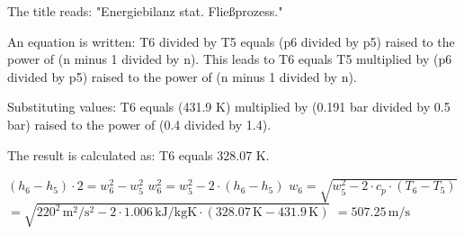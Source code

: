 The title reads: "Energiebilanz stat. Fließprozess."  

An equation is written:  
T6 divided by T5 equals (p6 divided by p5) raised to the power of (n minus 1 divided by n).  
This leads to T6 equals T5 multiplied by (p6 divided by p5) raised to the power of (n minus 1 divided by n).  

Substituting values:  
T6 equals (431.9 K) multiplied by (0.191 bar divided by 0.5 bar) raised to the power of (0.4 divided by 1.4).  

The result is calculated as:  
T6 equals 328.07 K.

\( (h_6 - h_5) \cdot 2 = w_6^2 - w_5^2 \)  
\( w_6^2 = w_5^2 - 2 \cdot (h_6 - h_5) \)  
\( w_6 = \sqrt{w_5^2 - 2 \cdot c_p \cdot (T_6 - T_5)} \)  
\( = \sqrt{220^2 \, \text{m}^2/\text{s}^2 - 2 \cdot 1.006 \, \text{kJ}/\text{kgK} \cdot (328.07 \, \text{K} - 431.9 \, \text{K})} \)  
\( = 507.25 \, \text{m/s} \)